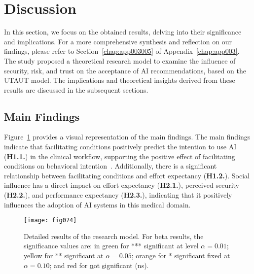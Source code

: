 \section{Discussion}
\label{sec:chap004006}

In this section, we focus on the obtained results, delving into their significance and implications.
For a more comprehensive synthesis and reflection on our findings, please refer to Section~\ref{chap:app003005} of Appendix~\ref{chap:app003}.
The study proposed a theoretical research model to examine the influence of security, risk, and trust on the acceptance of \ac{AI} recommendations, based on the \ac{UTAUT} model.
The implications and theoretical insights derived from these results are discussed in the subsequent sections.

\subsection{Main Findings}
\label{sec:chap004006001}

Figure~\ref{fig:fig074} provides a visual representation of the main findings.
The main findings indicate that facilitating conditions positively predict the intention to use \ac{AI} ({\bf H1.1.}) in the clinical workflow, supporting the positive effect of facilitating conditions on behavioral intention~\cite{DWIVEDI2016174, Seethamraju2018}.
Additionally, there is a significant relationship between facilitating conditions and effort expectancy ({\bf H1.2.}).
Social influence has a direct impact on effort expectancy ({\bf H2.1.}), perceived security ({\bf H2.2.}), and performance expectancy ({\bf H2.3.}), indicating that it positively influences the adoption of \ac{AI} systems in this medical domain.

\begin{figure}[htpb]
\centering
\texttt{[image: fig074]}
\caption{Detailed results of the research model. For beta results, the significance values are: in green for *** significant at level $\alpha = 0.01$; yellow for ** significant at $\alpha = 0.05$; orange for * significant fixed at $\alpha = 0.10$; and red for \underline{n}ot \underline{s}ignificant (ns).}
\label{fig:fig074}
\end{figure}

